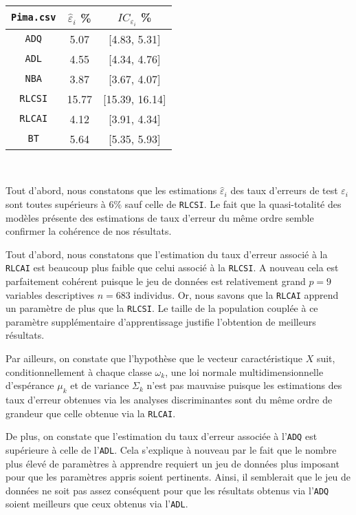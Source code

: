 \documentclass{article}
\begin{document}
\begin{multicols}{2}
\begin{center}
\begin{tabular}{| c || c | c |}
\hline
\texttt{Pima.csv} & $\widehat{\varepsilon}_i$ \% & $IC_{\varepsilon_{i}}$ \% \\
\hline
\hline
\texttt{ADQ} & 5.07 & [4.83, 5.31] \\
\hline
\texttt{ADL} & 4.55 & [4.34, 4.76] \\
\hline
\texttt{NBA} & 3.87 & [3.67, 4.07] \\
\hline
\texttt{RLCSI} & 15.77 & [15.39, 16.14] \\
\hline
\texttt{RLCAI} & 4.12 & [3.91, 4.34] \\
\hline
\texttt{BT} & 5.64 & [5.35, 5.93] \\
\hline
\end{tabular}\\ 
\end{center}

Tout d'abord, nous constatons que les estimations  $\widehat{\varepsilon}_i$  des taux d'erreurs de test $\varepsilon_i$ sont toutes supérieurs à $6 \%$ sauf celle de \texttt{RLCSI}. Le fait que la quasi-totalité des modèles présente des estimations de taux d'erreur du même ordre semble confirmer la cohérence de nos résultats. 

Tout d'abord, nous constatons que l'estimation du taux d'erreur associé à la \texttt{RLCAI} est beaucoup plus faible que celui associé à la \texttt{RLCSI}. A nouveau cela est parfaitement cohérent puisque le jeu de données est relativement grand $p = 9$ variables descriptives $n = 683$ individus. Or, nous savons que la \texttt{RLCAI} apprend un paramètre de plus que la \texttt{RLCSI}. Le taille de la population couplée à ce paramètre supplémentaire d'apprentissage justifie l'obtention de meilleurs résultats.

Par ailleurs, on constate que l'hypothèse que le vecteur caractéristique $X$ suit, conditionnellement à chaque classe $\omega_k$, une loi normale multidimensionnelle d'espérance $\mu_k$ et de variance $\Sigma_k$ n'est pas mauvaise puisque les estimations des taux d'erreur obtenues via les analyses discriminantes sont du même ordre de grandeur que celle obtenue via la \texttt{RLCAI}. 

De plus, on constate que l'estimation du taux d'erreur associée à l'\texttt{ADQ} est supérieure à celle de l'\texttt{ADL}. Cela s'explique à nouveau par le fait que le nombre plus élevé de paramètres à apprendre requiert un jeu de données plus imposant pour que les paramètres appris soient pertinents. Ainsi, il semblerait que le jeu de données ne soit pas assez conséquent pour que les résultats obtenus via l'\texttt{ADQ} soient meilleurs que ceux obtenus via l'\texttt{ADL}. 


\end{multicols}
\end{document}
